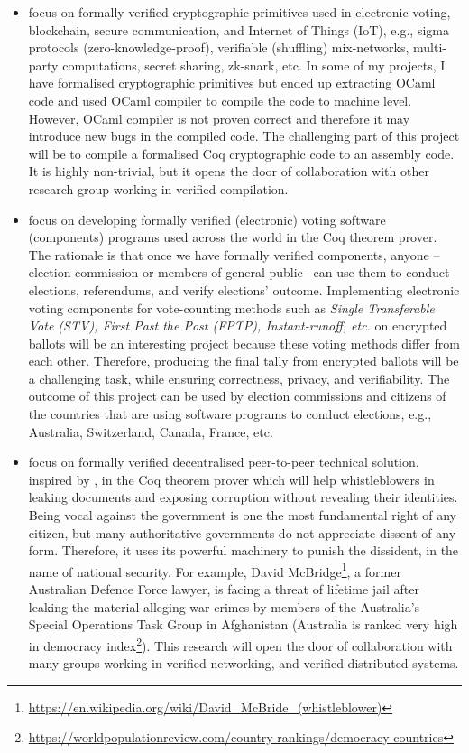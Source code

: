 \documentclass[a4paper]{article}
\begin{document}
\begin{itemize}



\item focus on formally verified cryptographic primitives used in electronic voting, 
  	blockchain, secure communication, and Internet of Things (IoT), e.g., 
	sigma protocols (zero-knowledge-proof), verifiable (shuffling) mix-networks, 
	multi-party computations, secret sharing, zk-snark, etc. 
	In some of my projects, I have formalised
	cryptographic primitives but ended up extracting OCaml 
	code and used OCaml compiler to 
	compile the code to machine level. However, OCaml compiler is not proven correct 
	and therefore it may introduce new bugs in the compiled code. The challenging part 
	of this project will be to compile a formalised Coq cryptographic 
	code to an assembly code. It is highly non-trivial, but it opens the door of 
	collaboration with other research group working in verified compilation.

\item focus on developing formally verified (electronic) voting 
software (components) programs used across the world in the Coq theorem prover. 
The rationale is that once we have formally verified 
components, anyone --election commission or members of general public-- can use them 
to conduct elections, referendums, and verify elections' outcome.
Implementing electronic voting components  
for vote-counting methods such as \textit{Single Transferable Vote (STV), 
First Past the Post (FPTP), Instant-runoff, etc.} on encrypted ballots will be 
an interesting project because these 
voting methods differ from each other. Therefore, producing the final tally from encrypted 
ballots will be a challenging task, while ensuring correctness, privacy, and 
verifiability. The outcome of this project can be used by election commissions and citizens of 
the countries that are using software programs to conduct elections, e.g.,
Australia, Switzerland, Canada, France, etc. 

\item focus on formally verified decentralised peer-to-peer technical solution, inspired by 
\cite{liu2004linkable, Clarke2001, schimmer2009peer, 10.1145/1866307.1866346}, in the Coq theorem prover which will help 
whistleblowers in leaking documents and exposing corruption without revealing their identities.
Being vocal against the government is one the most fundamental right of any citizen, but many 
authoritative governments do not appreciate dissent of any form. Therefore, it uses 
its powerful machinery to punish the dissident, in the name of national security. 
For example, David McBridge\footnote{\url{https://en.wikipedia.org/wiki/David_McBride_(whistleblower)}}, 
a former Australian Defence Force lawyer,  
is facing a threat of lifetime jail after
leaking the material alleging war crimes by members of the Australia's Special Operations
Task Group in Afghanistan (Australia is ranked very high in 
democracy index\footnote{\url{https://worldpopulationreview.com/country-rankings/democracy-countries}}). 
This research will open the door of collaboration with many groups working in verified 
networking, and verified distributed systems. 


\end{itemize}
\end{document}
